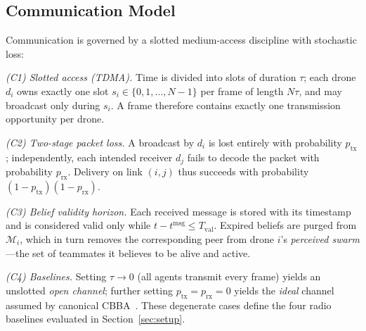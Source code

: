 \subsection{Communication Model}\label{sec:comm-model}
Communication is governed by a slotted medium-access discipline with stochastic loss:

\emph{(C1) Slotted access (TDMA).}
Time is divided into slots of duration $\tau$; each drone $d_i$ owns exactly one slot $s_i \in \{0, 1, \ldots, N-1\}$ per frame of length $N\tau$, and may broadcast only during $s_i$.
A frame therefore contains exactly one transmission opportunity per drone.

\emph{(C2) Two-stage packet loss.}
A broadcast by $d_i$ is lost entirely with probability $p_{\mathrm{tx}}$; independently, each intended receiver $d_j$ fails to decode the packet with probability $p_{\mathrm{rx}}$.
Delivery on link $(i,j)$ thus succeeds with probability $(1 - p_{\mathrm{tx}})(1 - p_{\mathrm{rx}})$.

\emph{(C3) Belief validity horizon.}
Each received message is stored with its timestamp and is considered valid only while $t - t^{\mathrm{msg}} \leq T_{\mathrm{val}}$.
Expired beliefs are purged from $\mathcal{M}_i$, which in turn removes the corresponding peer from drone $i$'s \emph{perceived swarm}---the set of teammates it believes to be alive and active.

\emph{(C4) Baselines.}
Setting $\tau \to 0$ (all agents transmit every frame) yields an unslotted \emph{open channel}; further setting $p_{\mathrm{tx}} = p_{\mathrm{rx}} = 0$ yields the \emph{ideal} channel assumed by canonical CBBA~\cite{choi2009}.
These degenerate cases define the four radio baselines evaluated in Section~\ref{sec:setup}.

